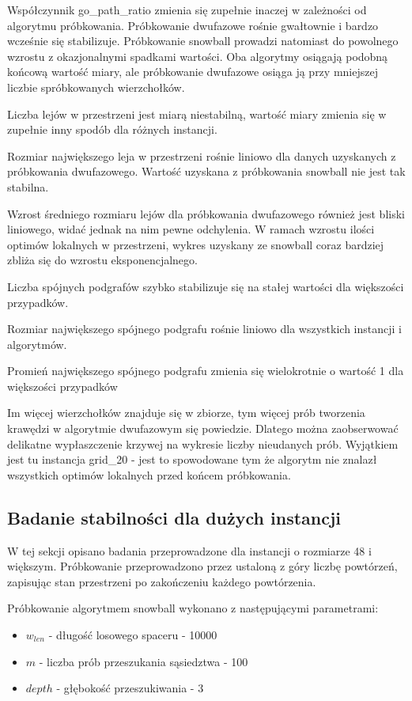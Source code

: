 Współczynnik go\_path\_ratio zmienia się zupełnie inaczej w zależności od algorytmu próbkowania.
Próbkowanie dwufazowe rośnie gwałtownie i bardzo wcześnie się stabilizuje.
Próbkowanie snowball prowadzi natomiast do powolnego wzrostu z okazjonalnymi spadkami wartości.
Oba algorytmy osiągają podobną końcową wartość miary, ale próbkowanie dwufazowe osiąga ją przy mniejszej
liczbie spróbkowanych wierzchołków.

Liczba lejów w przestrzeni jest miarą niestabilną, wartość miary zmienia się w zupełnie inny spodób
dla różnych instancji.

Rozmiar największego leja w przestrzeni rośnie liniowo dla danych uzyskanych z próbkowania
dwufazowego. Wartość uzyskana z próbkowania snowball nie jest tak stabilna.

Wzrost średniego rozmiaru lejów dla próbkowania dwufazowego również jest bliski liniowego,
widać jednak na nim pewne odchylenia. W ramach wzrostu ilości optimów lokalnych w przestrzeni,
wykres uzyskany ze snowball coraz bardziej zbliża się do wzrostu eksponencjalnego.

Liczba spójnych podgrafów szybko stabilizuje się na stałej wartości dla większości przypadków.

Rozmiar największego spójnego podgrafu rośnie liniowo dla wszystkich instancji i algorytmów.

Promień największego spójnego podgrafu zmienia się wielokrotnie o wartość 1 dla większości przypadków

Im więcej wierzchołków znajduje się w zbiorze, tym więcej prób tworzenia krawędzi w algorytmie dwufazowym
się powiedzie. Dlatego można zaobserwować delikatne wypłaszczenie krzywej na wykresie liczby nieudanych prób.
Wyjątkiem jest tu instancja grid\_20  - jest to spowodowane tym że algorytm nie znalazł wszystkich optimów
lokalnych przed końcem próbkowania.

\subsection{Badanie stabilności dla dużych instancji}
W tej sekcji opisano badania przeprowadzone dla instancji o rozmiarze 48 i większym.
Próbkowanie przeprowadzono przez ustaloną z góry liczbę powtórzeń, zapisując stan przestrzeni po zakończeniu każdego powtórzenia.

Próbkowanie algorytmem snowball wykonano z następującymi parametrami:
\begin{itemize}
    \item $w_{len}$ - długość losowego spaceru - 10000
    \item $m$ - liczba prób przeszukania sąsiedztwa - 100
    \item $depth$ - głębokość przeszukiwania - 3
\end{itemize}

